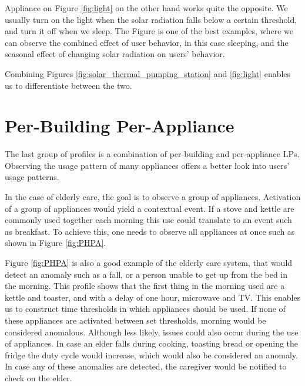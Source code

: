 Appliance on Figure \ref{fig:light} on the other hand works quite the opposite.
We usually turn on the light when the solar radiation falls below a certain threshold, and turn it off when we sleep.
The Figure is one of the best examples, where we can observe the combined effect of user behavior, in this case sleeping, and the seasonal effect of changing solar radiation on users' behavior. 

Combining Figures \ref{fig:solar_thermal_pumping_station} and \ref{fig:light} enables us to differentiate between the two. 

\section{Per-Building Per-Appliance}

The last group of profiles is a combination of per-building and per-appliance LPs.
Observing the usage pattern of many appliances offers a better look into users' usage patterns.

In the case of elderly care, the goal is to observe a group of appliances.
Activation of a group of appliances would yield a contextual event.
If a stove and kettle are commonly used together each morning this use could translate to an event such as breakfast. 
To achieve this, one needs to observe all appliances at once such as shown in Figure \ref{fig:PHPA}.

Figure \ref{fig:PHPA} is also a good example of the elderly care system, that would detect an anomaly such as a fall, or a person unable to get up from the bed in the morning.
This profile shows that the first thing in the morning used are a kettle and toaster, and with a delay of one hour, microwave and TV. 
This enables us to construct time thresholds in which appliances should be used.
If none of these appliances are activated between set thresholds, morning would be considered anomalous.
Although less likely, issues could also occur during the use of appliances. 
In case an elder falls during cooking, toasting bread or opening the fridge the duty cycle would increase, which would also be considered an anomaly.
In case any of these anomalies are detected, the caregiver would be notified to check on the elder. 

